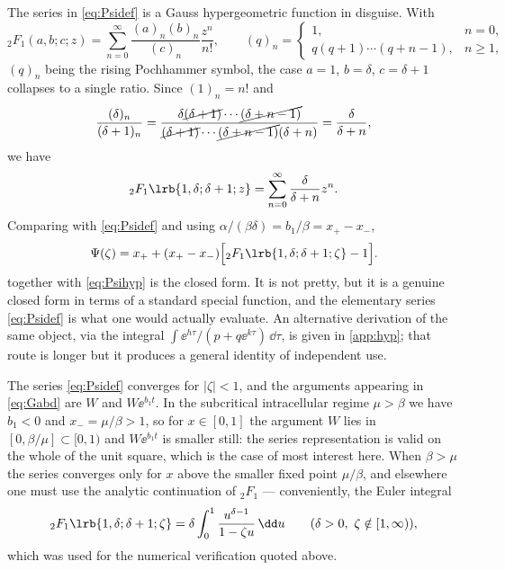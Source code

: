 The series in \cref{eq:Psidef} is a Gauss hypergeometric function in disguise. With
\begin{equation}
\label{eq:2F1def}
{}_2F_1(a,b;c;z) = \sum^\infty_{n=0}\frac{(a)_n(b)_n}{(c)_n}\frac{z^n}{n!},
\qquad
(q)_n = \begin{cases} 1, & n=0,\\ q(q+1)\cdots(q+n-1), & n\ge1,\end{cases}
\end{equation}
$(q)_n$ being the rising Pochhammer symbol, the case $a=1$, $b=\delta$, $c=\delta+1$
collapses to a single ratio. Since $(1)_n = n!$ and
\begin{equation}
\label{eq:pochcancel}
\frac{(\delta)_n}{(\delta+1)_n}
= \frac{\delta\cancel{(\delta+1)}\cdots\cancel{(\delta+n-1)}}{\cancel{(\delta+1)}\cdots\cancel{(\delta+n-1)}(\delta+n)}
= \frac{\delta}{\delta+n},
\end{equation}
we have
\begin{equation}
\label{eq:2F1simple}
{}_2F_1\lrb{1,\delta;\delta+1;z} = \sum_{n=0}^{\infty}\frac{\delta}{\delta+n}z^n .
\end{equation}
Comparing with \cref{eq:Psidef} and using $\alpha/(\beta\delta) = b_1/\beta = x_+-x_-$,
\begin{equation}
\label{eq:Psihyp}
\Psi(\zeta) = x_+ + (x_+-x_-)\Bigl[{}_2F_1\lrb{1,\delta;\delta+1;\zeta} - 1\Bigr].
\end{equation}
 together with \cref{eq:Psihyp} is the closed form. It is not pretty, but
it is a genuine closed form in terms of a standard special function, and the elementary
series \cref{eq:Psidef} is what one would actually evaluate. An alternative derivation of
the same object, via the integral $\int\ee^{h\tau}/(p+q\ee^{k\tau})\,\dd\tau$, is given
in \cref{app:hyp}; that route is longer but it produces a general identity of independent
use.

\begin{remark}
\label{rem:domain}
The series \cref{eq:Psidef} converges for $|\zeta|<1$, and the arguments appearing in
\cref{eq:Gabd} are $W$ and $W\ee^{b_1t}$. In the subcritical intracellular regime
$\mu>\beta$ we have $b_1<0$ and $x_-=\mu/\beta>1$, so for $x\in[0,1]$ the argument $W$
lies in $[0,\beta/\mu]\subset[0,1)$ and $W\ee^{b_1t}$ is smaller still: the series
representation is valid on the whole of the unit square, which is the case of most
interest here. When $\beta>\mu$ the series converges only for $x$ above the smaller fixed
point $\mu/\beta$, and elsewhere one must use the analytic continuation of ${}_2F_1$ ---
conveniently, the Euler integral
\begin{equation*}
{}_2F_1\lrb{1,\delta;\delta+1;\zeta} = \delta\int_0^1 \frac{u^{\delta-1}}{1-\zeta u}\,\dd u
\qquad (\delta>0,\ \zeta\notin[1,\infty)),
\end{equation*}
which was used for the numerical verification quoted above.
\end{remark}

